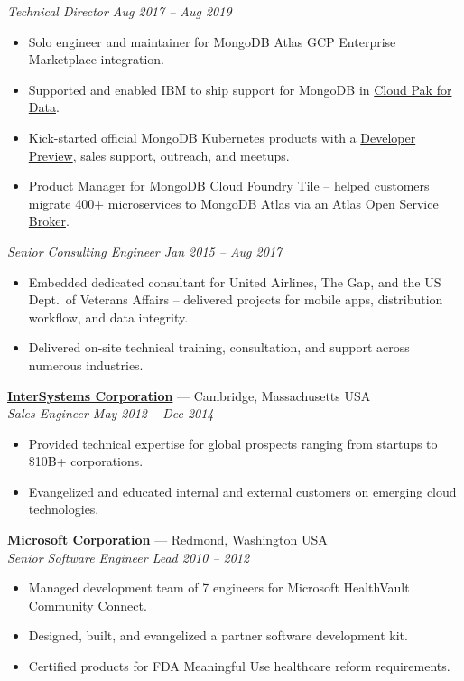 \documentclass[10pt,letterpaper]{article}
\begin{document}
\textit{Technical Director \hfill Aug 2017 -- Aug 2019}
\begin{itemize}
\item Solo engineer and maintainer for MongoDB Atlas GCP Enterprise Marketplace integration.
\item Supported and enabled IBM to ship support for MongoDB in \href{https://www.ibm.com/products/cloud-pak-for-data}{Cloud Pak for Data}.
\item Kick-started official MongoDB Kubernetes products with a \href{https://cloud.redhat.com/blog/dev-preview-mongodb-enterprise-running-on-openshift}{Developer Preview}, sales support, outreach, and meetups.
\item Product Manager for MongoDB Cloud Foundry Tile -- helped customers migrate 400+ microservices to MongoDB Atlas via an \href{https://github.com/mongodb/atlas-osb}{Atlas Open Service Broker}.
\end{itemize}

\textit{Senior Consulting Engineer \hfill Jan 2015 -- Aug 2017}
\begin{itemize}
\item Embedded dedicated consultant for United Airlines, The Gap, and the US Dept.\ of Veterans Affairs -- delivered projects for mobile apps, distribution workflow, and data integrity.
\item Delivered on-site technical training, consultation, and support across numerous industries.
\end{itemize}

\textbf{\href{http://www.intersystems.com/}{InterSystems Corporation}} --- Cambridge, Massachusetts USA\\
\textit{Sales Engineer \hfill May 2012 -- Dec 2014}
\begin{itemize}
\item Provided technical expertise for global prospects ranging from startups to \$10B+ corporations.
\item Evangelized and educated internal and external customers on emerging cloud technologies.
\end{itemize}

\textbf{\href{http://www.microsoft.com}{Microsoft Corporation}} --- Redmond, Washington USA\\
\textit{Senior Software Engineer Lead \hfill 2010 -- 2012}
\begin{itemize}
\item Managed development team of 7 engineers for Microsoft HealthVault Community Connect.
\item Designed, built, and evangelized a partner software development kit.
\item Certified products for FDA Meaningful Use healthcare reform requirements.
\end{itemize}
\end{document}
